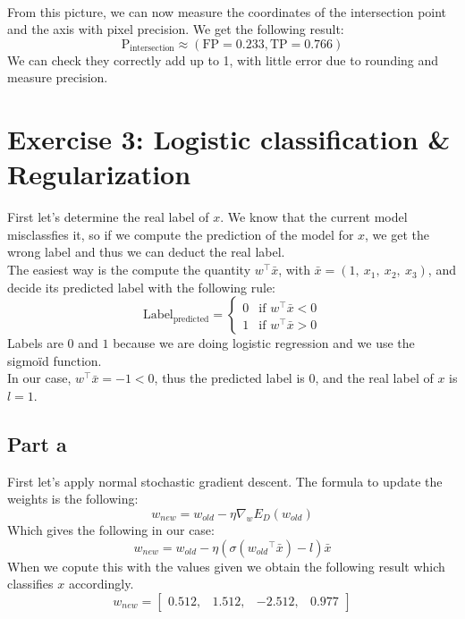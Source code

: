 \documentclass[a4paper, 10pt]{article}
\begin{document}
\\
From this picture, we can now measure the coordinates of the intersection point and the axis with pixel precision.
We get the following result:
$$
\text{P}_\text{intersection} \approx (\text{FP}=0.233, \text{TP}=0.766)
$$
We can check they correctly add up to 1, with little error due to rounding and measure precision.

\section{Exercise 3: Logistic classification \& Regularization}
First let's determine the real label of $x$. We know that the current model misclassfies it,
so if we compute the prediction of the model for $x$, we get the wrong label and thus we can 
deduct the real label.
\\
The easiest way is the compute the quantity $w^\top \bar{x}$, with $\bar{x} = (1,\ x_1,\ x_2,\ x_3)$, and decide its predicted label with the following rule:
$$
\text{Label}_\text{predicted} = \left\{ \begin{array}{ll}  
                                    0 & \text{if $w^\top \bar{x} < 0$}
                                    \\ 
                                    1 & \text{if $w^\top \bar{x} > 0$}
                                        \end{array}
                                \right.
$$
Labels are $0$ and $1$ because we are doing logistic regression and we use the sigmoïd function.
\\
In our case, $w^\top \bar{x} = -1 <0$, thus the predicted label is $0$, and the real label of $x$ is $l=1$.
\subsection{Part a}
First let's apply normal stochastic gradient descent. The formula to update the weights is the following:
$$
w_{new} = w_{old} - \eta \nabla_w E_D(w_{old})
$$
Which gives the following in our case:
$$
w_{new} = w_{old} - \eta (\sigma({w_{old}}^\top \bar{x}) - l) \bar{x}
$$
When we copute this with the values given we obtain the following result which
classifies $x$ accordingly.
$$
w_{new} = \begin{bmatrix}
    0.512, & 1.512, & -2.512, & 0.977
\end{bmatrix}
$$
\end{document}
